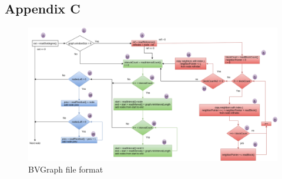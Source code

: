 \begin{landscape}
\chapter{Appendix C}

\begin{figure}[ht]
    \centering
    \includegraphics[scale=.45]{figure/BVGraph_format}
    \caption{BVGraph file format}
    \label{fig:BVGraphFormat}
\end{figure}

\end{landscape}